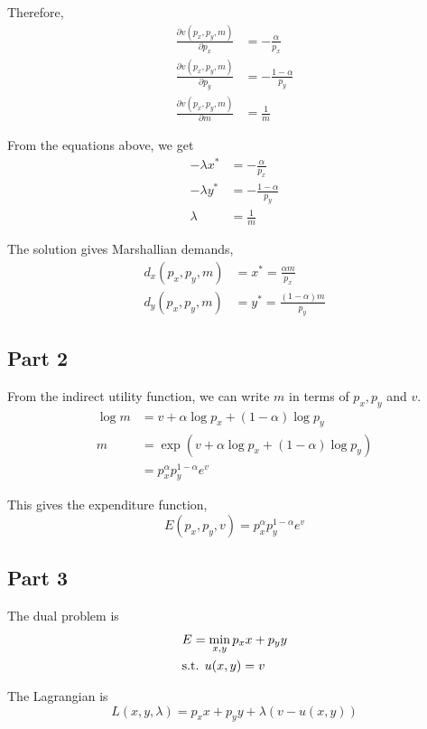 \documentclass{article}
\begin{document}
Therefore,
\begin{align*}
	\frac{\partial v(p_x,p_y,m)}{\partial p_x}&=-\frac{\alpha}{p_x}\\
	\frac{\partial v(p_x,p_y,m)}{\partial p_y}&=-\frac{1-\alpha}{p_y}\\
	\frac{\partial v(p_x,p_y,m)}{\partial m}&=\frac{1}{m}
\end{align*}

From the equations above, we get
\begin{align*}
	-\lambda x^*&=-\frac{\alpha}{p_x}\\
	-\lambda y^*&=-\frac{1-\alpha}{p_y}\\
	\lambda&=\frac{1}{m}
\end{align*}

The solution gives Marshallian demands,
\begin{align*}
	d_x(p_x,p_y,m)&=x^*=\frac{\alpha m}{p_x}\\
	d_y(p_x,p_y,m)&=y^*=\frac{(1-\alpha)m}{p_y}
\end{align*}

\subsection{Part 2}
From the indirect utility function, we can write $m$ in terms of $p_x,p_y$ and $v$.
\begin{align*}
	\log m&=v+\alpha\log p_x+(1-\alpha)\log p_y\\
	m&=\exp(v+\alpha\log p_x+(1-\alpha)\log p_y)\\
	&=p_x^\alpha p_y^{1-\alpha}e^v
\end{align*}

This gives the expenditure function,
\begin{equation*}
	E(p_x,p_y,v)=p_x^\alpha p_y^{1-\alpha}e^v
\end{equation*}

\subsection{Part 3}
The dual problem is
\begin{align*}
	&E=\min_{x,y}p_xx+p_yy\\
	&\textup{s.t. }u(x,y)=v
\end{align*}

The Lagrangian is
\begin{equation*}
	L(x,y,\lambda)=p_xx+p_yy+\lambda(v-u(x,y))
\end{equation*}
\end{document}
